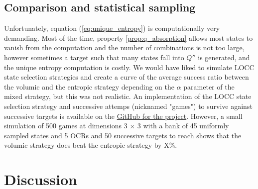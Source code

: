 \subsection{Comparison and statistical sampling}

Unfortunately, equation (\ref{eq:unique_entropy}) is computationally very demanding. Most of the time, property \ref{prop:q_absorption} allows most states to vanish from the computation and the number of combinations is not too large, however sometimes a target such that many states fall into $Q''$ is generated, and the unique entropy computation is costly. We would have liked to simulate LOCC state selection strategies and create a curve of the average success ratio between the volumic and the entropic strategy depending on the $\alpha$ parameter of the mixed strategy, but this was not realistic. An implementation of the LOCC state selection strategy and successive attemps (nicknamed "games") to survive against successive targets is available on the \href{https://github.com/traaldbjerg/MajoLat}{GitHub for the project}. However, a small simulation of 500 games at dimensions 3 $\times$ 3 with a bank of 45 uniformly sampled states and 5 OCRs and 50 successive targets to reach shows that the volumic strategy does beat the entropic strategy by X\%.



\section{Discussion}

